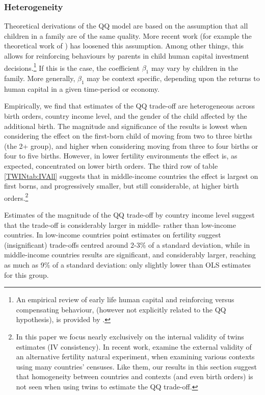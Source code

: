 \subsubsection{Heterogeneity}
Theoretical derivations of the QQ model are based on the assumption that all
children in a family are of the same quality. More recent work (for example the 
theoretical work of \citet{AizerCunha2012}) has loosened this assumption. Among 
other things, this allows for reinforcing behaviours by parents in child human 
capital investment decisions.\footnote{An empirical review of early life human 
capital and reinforcing versus compensating behaviour, (however not explicitly 
related to the QQ hypothesis), is provided by \citet{AlmondMazumder2013}.} If 
this is the case, the coefficient $\beta_1$ may vary by children in the family. 
More generally, $\beta_1$ may be context specific, depending upon the returns to 
human capital in a given time-period or economy.

Empirically, we find that estimates of the QQ trade-off are heterogeneous 
across birth orders, country income level, and the gender of the child affected 
by the additional birth. The magnitude and significance of the results is lowest 
when considering the effect on the first-born child of moving from two to three 
births (the 2+ group), and higher when considering moving from three to four 
births or four to five births. However, in lower fertility environments the 
effect is, as expected, concentrated on lower birth orders. The third row of 
table \ref{TWINtab:IVAll} suggests that in middle-income countries the effect is 
largest on first borns, and progressively smaller, but still considerable, at 
higher birth orders.\footnote{In this paper we focus nearly exclusively on
the internal validity of twins estimates (IV consistency).  In recent work,
\citet{Deheijaetal2015} examine the external validity of an alternative 
fertility natural experiment, when examining various contexts using many
countries' censuses.  Like them, our results in this section suggest that
homogeneity between countries and contexts (and even birth orders) is not
seen when using twins to estimate the QQ trade-off.}

Estimates of the magnitude of the QQ trade-off by country income level suggest 
that the trade-off is considerably larger in middle- rather than low-income 
countries. In low-income countries point estimates on fertility suggest 
(insignificant) trade-offs centred around 2-3\% of a standard deviation, while 
in middle-income countries results are significant, and considerably larger,
reaching as much as 9\% of a standard deviation: only slightly lower than OLS 
estimates for this group.

